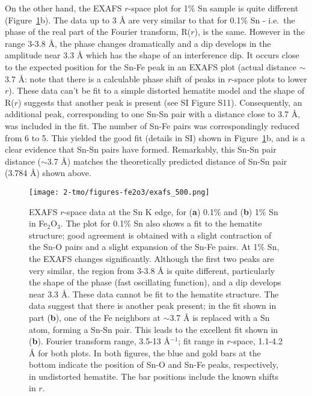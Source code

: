 On the other hand, the EXAFS $r$-space plot for 1\% Sn sample is quite different (Figure~\ref{exafs}b). The data up to 3 {\AA} are very similar to that for 0.1\% Sn - i.e.\ the phase of the real part of the Fourier transform, R($r$), is the same. However in the range 3-3.8 {\AA}, the phase changes dramatically and a dip develops in the amplitude near 3.3 {\AA} which has the  shape of an interference dip. It occurs close to the expected position for the Sn-Fe peak in an EXAFS plot (actual distance $\sim$3.7 {\AA}: note that there is a calculable phase shift of peaks in $r$-space plots to lower $r$). These data can't be fit to a simple distorted hematite model and the shape of R($r$) suggests that another peak is present (see SI Figure S11). Consequently, an additional peak, corresponding to one Sn-Sn pair with a distance close to 3.7 {\AA}, was included in the fit. The number of Sn-Fe pairs was correspondingly reduced from 6 to 5. This yielded the good fit (details in SI) shown in Figure~\ref{exafs}b, and is a clear evidence that Sn-Sn pairs have formed.
Remarkably, this Sn-Sn pair distance ($\sim$3.7 {\AA}) matches the theoretically predicted distance of Sn-Sn pair (3.784 {\AA}) shown above.

\begin{figure}[H]
    \centering
    \texttt{[image: 2-tmo/figures-fe2o3/exafs\_500.png]}
    \caption{EXAFS $r$-space data at the Sn K edge, for (\textbf{a}) 0.1\% and (\textbf{b}) 1\% Sn in Fe$_2$O$_3$. The plot for 0.1\% Sn also shows a fit to the hematite structure; good agreement is obtained with a slight contraction of the Sn-O pairs and a slight expansion of the Sn-Fe pairs. At 1\% Sn, the EXAFS changes significantly. Although the first two peaks are very similar, the region from 3-3.8 \AA{} is quite different, particularly the shape of the phase (fast oscillating function), and a dip develops near 3.3 \AA{}. These data cannot be fit to the hematite structure. The data suggest that there is another peak present; in the fit shown in part (\textbf{b}), one of the Fe neighbors at $\sim$3.7 \AA{} is replaced with a Sn atom, forming a Sn-Sn pair. This leads to the excellent fit shown in (\textbf{b}).
    Fourier transform range, 3.5-13 \AA$^{-1}$; fit range in $r$-space, 1.1-4.2 \AA{} for both plots.
    In both figures, the blue and gold bars at the bottom indicate the position of Sn-O and Sn-Fe peaks, respectively, in undistorted hematite. The bar positions include the known shifts in $r$.
    }
    \label{exafs}
\end{figure}


